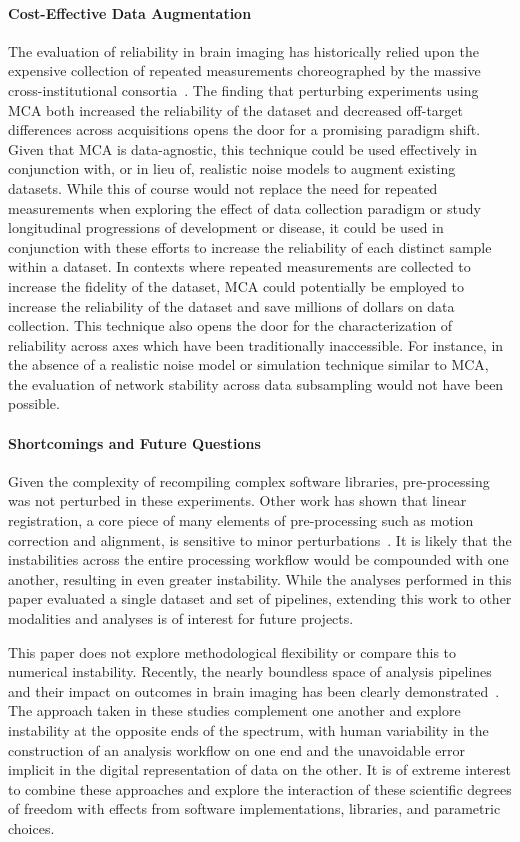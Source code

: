 \documentclass[fleqn,10pt]{SelfArx} %
\begin{document}
\paragraph{Cost-Effective Data Augmentation}
The evaluation of reliability in brain imaging has historically relied upon the expensive collection of repeated
measurements choreographed by the massive cross-institutional consortia~\cite{van2013wu,zuo2014open}. The finding that
perturbing experiments using MCA both increased the reliability of the dataset and decreased off-target differences
across acquisitions opens the door for a promising paradigm shift. Given that MCA is data-agnostic, this technique
could be used effectively in conjunction with, or in lieu of, realistic noise models to augment existing datasets.
While this of course would not replace the need for repeated measurements when exploring the effect of data collection
paradigm or study longitudinal progressions of development or disease, it could be used in conjunction with these
efforts to increase the reliability of each distinct sample within a dataset. In contexts where repeated measurements
are collected to increase the fidelity of the dataset, MCA could potentially be employed to increase the reliability of
the dataset and save millions of dollars on data collection. This technique also opens the door for the
characterization of reliability across axes which have been traditionally inaccessible. For instance, in the absence of
a realistic noise model or simulation technique similar to MCA, the evaluation of network stability across data
subsampling would not have been possible.

\paragraph{Shortcomings and Future Questions}
Given the complexity of recompiling complex software libraries, pre-processing was not perturbed in these experiments.
Other work has shown that linear registration, a core piece of many elements of pre-processing such as motion
correction and alignment, is sensitive to minor perturbations~\cite{Glatard2015-vc}. It is likely that the
instabilities across the entire processing workflow would be compounded with one another, resulting in even greater
instability. While the analyses performed in this paper evaluated a single dataset and set of pipelines, extending this
work to other modalities and analyses is of interest for future projects.

This paper does not explore methodological flexibility or compare this to numerical instability. Recently, the nearly
boundless space of analysis pipelines and their impact on outcomes in brain imaging has been clearly
demonstrated~\cite{botvinik2020variability}. The approach taken in these studies complement one another and explore
instability at the opposite ends of the spectrum, with human variability in the construction of an analysis workflow on
one end and the unavoidable error implicit in the digital representation of data on the other. It is of extreme
interest to combine these approaches and explore the interaction of these scientific degrees of freedom with effects
from software implementations, libraries, and parametric choices.
\end{document}
